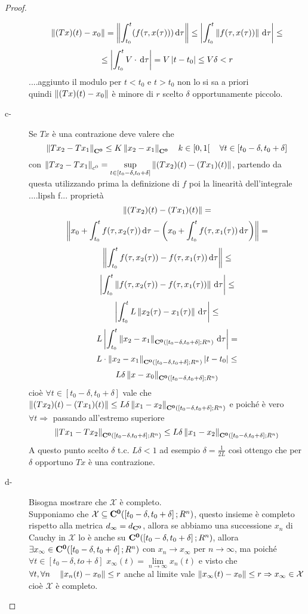 \begin{proof}
\begin{description}
		$$\left\|(Tx)(t) - x_0\right\| = \left\|\int_{t_0}^t(f(\tau,x(\tau)))\,\mathrm{d}{\tau}\right\| \le \left|\int_{t_0}^t \left\|f(\tau,x(\tau))\right\|\,\mathrm{d}{\tau}\right|\le$$
		$$\le\left|\int_{t_0}^t V\cdot \,\mathrm{d}{\tau}\right|=V\left|t-t_0\right|\le V\delta<r$$
		....aggiunto il modulo per $t<t_0$ e $t>t_0$ non lo si sa a priori\\
		quindi $\left\|(Tx)(t) - x_0\right\|$ è minore di $r$ scelto $\delta$ opportunamente piccolo. 
		\item[c-] Se $Tx$ è una contrazione deve valere che
		$$\left\|Tx_2 - Tx_1\right\|_{\mathbf{C^{0}}}\le K\left\|x_2-x_1\right\|_{\mathbf{C^{0}}}\quad k\in\left[0,1\right[\quad\forall t\in\left[t_0-\delta,t_0+\delta\right]$$
		con $\left\|Tx_2-Tx_1\right\|_{c^0}=\sup\limits_{t\in\left[t_0-\delta,t_0+\delta\right]}\left\|(Tx_2)(t) - (Tx_1)(t)\right\|$, partendo da questa utilizzando prima la definizione di $f$ poi la linearità dell'integrale ....lipsh f... proprietà
		$$\left\|(Tx_2)(t) - (Tx_1)(t)\right\|=$$
		$$\left\|x_0+\int_{t_0}^t f(\tau,x_2(\tau)) \,\mathrm{d}{\tau} - \left(x_0+\int_{t_0}^t f(\tau,x_1(\tau)) \,\mathrm{d}{\tau}\right)\right\|=$$
		$$\left\|\int_{t_0}^t f(\tau,x_2(\tau))-f(\tau,x_1(\tau)) \,\mathrm{d}{\tau}\right\|\le$$
		$$\left|\int_{t_0}^t \left\|f(\tau,x_2(\tau))-f(\tau,x_1(\tau))\right\| \,\mathrm{d}{\tau}\right|\le$$
		$$\left|\int_{t_0}^t L\left\|x_2(\tau)-x_1(\tau)\right\| \,\mathrm{d}{\tau}\right|\le$$
		$$L\left|\int_{t_0}^t \left\|x_2-x_1\right\|_{\mathbf{C^{0}}(\left[t_0-\delta,t_0+\delta\right];R^n)} \,\mathrm{d}{\tau}\right|=$$
		$$L\cdot \left\|x_2-x_1\right\|_{\mathbf{C^{0}}(\left[t_0-\delta,t_0+\delta\right];R^n)}\left|t-t_0\right|\le$$
		$$L\delta\left\|x-x_0\right\|_{\mathbf{C^{0}}(\left[t_0-\delta,t_0+\delta\right];R^n)}$$
		cioè $\forall t \in \left[t_0-\delta,t_0+\delta\right]$ vale che $\left\|(Tx_2)(t)-(Tx_1)(t)\right\|\le L\delta\left\|x_1-x_2\right\|_{\mathbf{C^{0}}(\left[t_0-\delta,t_0+\delta\right];R^n)}$ e poiché è vero $\forall t \Rightarrow $ passando all'estremo superiore
		$$ \left\|Tx_1 - Tx_2\right\|_{\mathbf{C^{0}}(\left[t_0-\delta,t_0+\delta\right];R^n)}\le L\delta\left\|x_1-x_2\right\|_{\mathbf{C^{0}}(\left[t_0-\delta,t_0+\delta\right];R^n)}$$
		A questo punto scelto $\delta$ t.c. $L\delta<1$ ad esempio $\delta=\frac{1}{2L}$ così ottengo che per $\delta$ opportuno $Tx$ è una contrazione.		
		\item[d-] Bisogna mostrare che $\mathcal{X}$ è completo.\\
		Supponiamo che $\mathcal{X}\subseteq \mathbf{C^{0}}(\left[t_0-\delta,t_0+\delta\right];R^n)$, questo insieme è completo rispetto alla metrica $d_\infty=d_{\mathbf{C^{0}}}$, allora se abbiamo una successione $x_n$ di Cauchy in $\mathcal{X}$ lo è anche su $\mathbf{C^{0}}(\left[t_0-\delta,t_0+\delta\right];R^n)$, allora $\exists x_\infty\in \mathbf{C^{0}}(\left[t_0-\delta,t_0+\delta\right];R^n)$ con $x_n\to x_\infty$ per $n\to\infty$, ma poiché $\forall t \in\left[t_0-\delta,to+\delta\right]$ $x_\infty(t)=\lim\limits_{n\to\infty}x_n(t)$ e visto che $\forall t,\forall n\quad \left\|x_n(t)-x_0\right\|\le r$ anche al limite vale $\left\|x_{\infty}(t)-x_0\right\|\le r \Rightarrow x_\infty\in\mathcal{X}$ cioè $\mathcal{X}$ è completo.

\end{description}
\end{proof}
